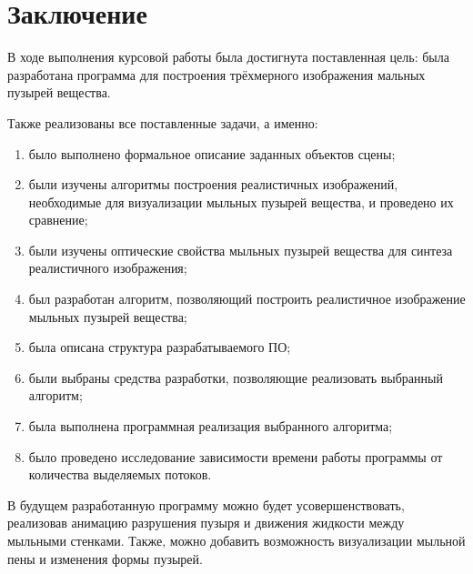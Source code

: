 \chapter*{Заключение}
В ходе выполнения курсовой работы была достигнута поставленная цель: была разработана программа для построения трёхмерного изображения мальных пузырей вещества.

Также реализованы все поставленные задачи, а именно:
\begin{enumerate}[label={\arabic*)}]
	\item было выполнено формальное описание заданных объектов сцены;
	\item были изучены алгоритмы построения реалистичных изображений, необходимые для визуализации мыльных пузырей вещества, и проведено их сравнение;
	\item были изучены оптические свойства мыльных пузырей вещества для синтеза реалистичного изображения;
	\item был разработан алгоритм, позволяющий построить реалистичное изображение мыльных пузырей вещества;
	\item была описана структура разрабатываемого ПО; 
	\item были выбраны средства разработки, позволяющие реализовать выбранный алгоритм;
	\item была выполнена программная реализация выбранного алгоритма;
	\item было проведено исследование зависимости времени работы программы от количества выделяемых потоков.
\end{enumerate}

В будущем разработанную программу можно будет усовершенствовать, реализовав анимацию разрушения пузыря и движения жидкости между мыльными стенками. Также, можно добавить возможность визуализации мыльной пены и изменения формы пузырей.

\newpage